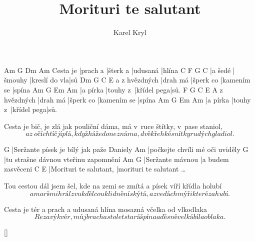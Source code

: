 \documentclass{song}
\title{Morituri te salutant}
\author{Karel Kryl}
\begin{document}
\strophe
         Am       G        Dm       Am
Cesta je |prach a |šterk a |udusaná |hlína
C       F       G\7           C
|a šedé |šmouhy |kreslí do vla|sů
              Dm       G         C           E
a z hvězdných |drah má |šperk co |kamením se |spína
Am       G        Em          Am
|a pírka |touhy z~|křídel pega|sů.
              F        G         C           E
A z hvězdných |drah má |šperk co |kamením se |spína
Am       G        Em          Am
|a pírka |touhy z~|křídel pega|sů.
\endstrophe

\strophe*
Cesta je bič, je zlá jak pouliční dáma,
má v~ruce štítky, v~pase staniol,
\[ a z~očí chtíč jí plá, když háže do neznáma,
dvě křehké snítky rudých gladiol. \]
\endstrophe

G
|Seržante písek je bílý jak paže Daniely
Am
|počkejte chvíli mé oči uviděly
G
|tu strašne dávnou vteřinu zapomnění
Am               G\7
|Seržante mávnou |a budem zasvěceni
C                      E
|Morituri te salutant, |morituri te salutant \ldots
\endstrophe

\strophe*
Tou cestou dál jsem šel, kde na zemi se zmítá
a písek víří křídla holubí
\[ a marš mi hrál zvuk děl co uklidnění skýtá,
a zvedá chmýři které zahubí. \]
\endstrophe

\strophe*
Cesta je tér a prach a udusaná hlína
mosazná včelka od vlkodlaka
\[ Rezavý kvér, můj brach a sto let stará špína
a děsně velká bíla oblaka. \]
\endstrophe

\ref{}
\end{document}
